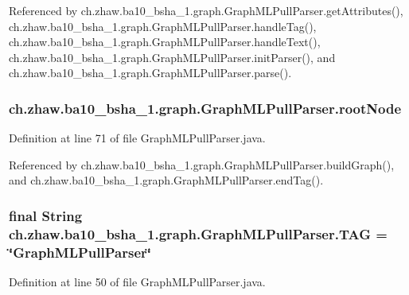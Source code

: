 Referenced by ch.zhaw.ba10\_\-bsha\_\-1.graph.GraphMLPullParser.getAttributes(), ch.zhaw.ba10\_\-bsha\_\-1.graph.GraphMLPullParser.handleTag(), ch.zhaw.ba10\_\-bsha\_\-1.graph.GraphMLPullParser.handleText(), ch.zhaw.ba10\_\-bsha\_\-1.graph.GraphMLPullParser.initParser(), and ch.zhaw.ba10\_\-bsha\_\-1.graph.GraphMLPullParser.parse().\hypertarget{classch_1_1zhaw_1_1ba10__bsha__1_1_1graph_1_1GraphMLPullParser_ae4185aa59926024ce10f7041d048d56f}{
\subsubsection[{rootNode}]{ {\bf ch.zhaw.ba10\_\-bsha\_\-1.graph.GraphMLPullParser.rootNode}}}
\label{classch_1_1zhaw_1_1ba10__bsha__1_1_1graph_1_1GraphMLPullParser_ae4185aa59926024ce10f7041d048d56f}


Definition at line 71 of file GraphMLPullParser.java.

Referenced by ch.zhaw.ba10\_\-bsha\_\-1.graph.GraphMLPullParser.buildGraph(), and ch.zhaw.ba10\_\-bsha\_\-1.graph.GraphMLPullParser.endTag().\hypertarget{classch_1_1zhaw_1_1ba10__bsha__1_1_1graph_1_1GraphMLPullParser_ab9f2c0c9b2d0193cb1fee32505e5bd9c}{
\subsubsection[{TAG}]{\setlength{\rightskip}{0pt plus 5cm}final String {\bf ch.zhaw.ba10\_\-bsha\_\-1.graph.GraphMLPullParser.TAG} = \char`\"{}GraphMLPullParser\char`\"{}}}
\label{classch_1_1zhaw_1_1ba10__bsha__1_1_1graph_1_1GraphMLPullParser_ab9f2c0c9b2d0193cb1fee32505e5bd9c}


Definition at line 50 of file GraphMLPullParser.java.

